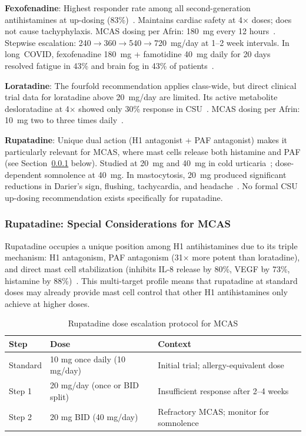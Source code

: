 \textbf{Fexofenadine}: Highest responder rate among all second-generation antihistamines at up-dosing (83\%)~\cite{Podder2023updosing}. Maintains cardiac safety at 4$\times$ doses; does not cause tachyphylaxis. MCAS dosing per Afrin: 180~mg every 12 hours~\cite{Afrin2013MCAS}. Stepwise escalation: 240$\rightarrow$360$\rightarrow$540$\rightarrow$720~mg/day at 1--2 week intervals. In long~COVID, fexofenadine 180~mg + famotidine 40~mg daily for 20 days resolved fatigue in 43\% and brain fog in 43\% of patients~\cite{Salvucci2023antihistamineLongCOVID}.

\textbf{Loratadine}: The fourfold recommendation applies class-wide, but direct clinical trial data for loratadine above 20~mg/day are limited. Its active metabolite desloratadine at 4$\times$ showed only 30\% response in CSU~\cite{Podder2023updosing}. MCAS dosing per Afrin: 10~mg two to three times daily~\cite{Afrin2013MCAS}.

\textbf{Rupatadine}: Unique dual action (H1 antagonist + PAF antagonist) makes it particularly relevant for MCAS, where mast cells release both histamine and PAF (see Section~\ref{sec:h1-updosing-rupatadine} below). Studied at 20~mg and 40~mg in cold urticaria~\cite{Magerl2015rupatadine}; dose-dependent somnolence at 40~mg. In mastocytosis, 20~mg produced significant reductions in Darier's sign, flushing, tachycardia, and headache~\cite{Izquierdo2024rupatadine}. No formal CSU up-dosing recommendation exists specifically for rupatadine.

\subsubsection{Rupatadine: Special Considerations for MCAS}
\label{sec:h1-updosing-rupatadine}

Rupatadine occupies a unique position among H1 antihistamines due to its triple mechanism: H1 antagonism, PAF antagonism (31$\times$ more potent than loratadine), and direct mast cell stabilization (inhibits IL-8 release by 80\%, VEGF by 73\%, histamine by 88\%)~\cite{Pinero-Gonzalez2024}. This multi-target profile means that rupatadine at standard doses may already provide mast cell control that other H1 antihistamines only achieve at higher doses.

\begin{table}[htbp]
\centering
\caption{Rupatadine dose escalation protocol for MCAS}
\label{tab:rupatadine-escalation}
\begin{tabular}{lll}
\toprule
\textbf{Step} & \textbf{Dose} & \textbf{Context} \\
\midrule
Standard & 10 mg once daily (10 mg/day) & Initial trial; allergy-equivalent dose \\
Step 1 & 20 mg/day (once or BID split) & Insufficient response after 2--4 weeks \\
Step 2 & 20 mg BID (40 mg/day) & Refractory MCAS; monitor for somnolence \\
\bottomrule
\end{tabular}
\end{table}

